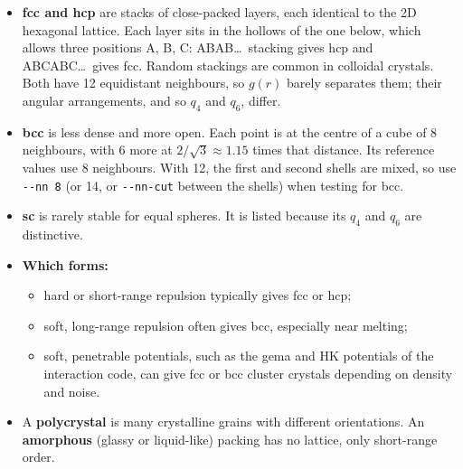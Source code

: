 \documentclass[11pt]{article}
\newcommand{\code}[1]{\texttt{#1}}
\begin{document}
\begin{itemize}
  \item \textbf{fcc and hcp} are stacks of close-packed layers, each identical
        to the 2D hexagonal lattice. Each layer sits in the hollows of the one
        below, which allows three positions A, B, C: ABAB\dots\ stacking gives
        hcp and ABCABC\dots\ gives fcc. Random stackings are common in
        colloidal crystals. Both have 12 equidistant neighbours, so $g(r)$
        barely separates them; their angular arrangements, and so $q_4$ and
        $q_6$, differ.
  \item \textbf{bcc} is less dense and more open. Each point is at the centre
        of a cube of 8 neighbours, with 6 more at $2/\sqrt3\approx1.15$ times
        that distance. Its reference values use 8 neighbours. With 12, the
        first and second shells are mixed, so use \code{-{}-nn 8} (or 14, or
        \code{-{}-nn-cut} between the shells) when testing for bcc.
  \item \textbf{sc} is rarely stable for equal spheres. It is listed because
        its $q_4$ and $q_6$ are distinctive.
  \item \textbf{Which forms:}
        \begin{itemize}[nosep]
          \item hard or short-range repulsion typically gives fcc or hcp;
          \item soft, long-range repulsion often gives bcc, especially near
                melting;
          \item soft, penetrable potentials, such as the gema and HK
                potentials of the interaction code, can give fcc or bcc
                cluster crystals depending on density and noise.
        \end{itemize}
  \item A \textbf{polycrystal} is many crystalline grains with different
        orientations. An \textbf{amorphous} (glassy or liquid-like) packing
        has no lattice, only short-range order.
\end{itemize}
\end{document}
